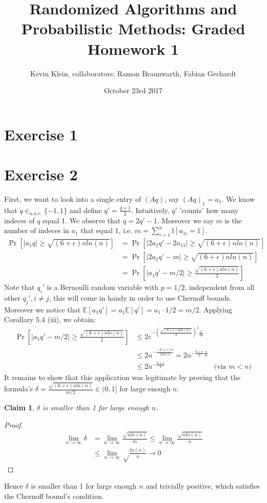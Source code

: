 \documentclass[a4paper,german]{article}
\title{Randomized Algorithms and Probabilistic Methods: Graded Homework 1}
\author{ Kevin Klein, collaborators: Ramon Braunwarth, Fabian Gerhardt}
\date{October 23rd 2017}
\newtheorem{claim}{Claim}
\newcommand{\E}{\mathbb{E}}
\begin{document}
\maketitle

\section*{Exercise 1}
\section*{Exercise 2}
First, we want to look into a single entry of \((Aq)\), say \((Aq)_1 = a_1\). We know that \(q \in_{u.a.r.} \{-1,1\}\) and define \(q' = \frac{q+1}{2}\). Intuitively, \(q'\) 'counts' how many indeces of \(q\) equal 1. We observe that \(q = 2q' - 1\).  Moreover we say \(m\) is the number of indeces in \(a_1\) that equal 1, i.e. \(m = \sum_{i=1}^n \mathbb{I}[a_{1i} = 1] \).
\begin{align*}
\Pr[|a_1q| \geq \sqrt {(6+\epsilon)nln(n)} ] &= \Pr[|2a_1q' - 2a_11| \geq \sqrt {(6+\epsilon)nln(n)} ] \\
 &= \Pr[|2a_1q' - m| \geq \sqrt {(6+\epsilon)nln(n)} ] \\
  &= \Pr[|a_1q' - m/2| \geq \frac{\sqrt {(6+\epsilon)nln(n)}}{2} ]
\end{align*}
Note that \(q_i'\) is a Bernoulli random variable with \(p = 1/2\), independent from all other \(q_j', i \neq j\), this will come in handy in order to use Chernoff bounds. Moreover we notice that \(\E[a_1q'] = 
a_1 \E[q'] = a_1 \cdot 1/2 = m/2 \).  Applying Corollary 5.4 (iii), we obtain:
\begin{align*}
 \Pr[|a_1q' - m/2| \geq \frac{\sqrt {(6+\epsilon)nln(n)}}{2} ] &\leq 2 e^{-(\frac{\sqrt {(6+\epsilon)nln(n)}}{2})^2 \frac{1}{3 \mu }} \\
 & \leq 2 n^{-\frac{(6+\epsilon)n}{12 m /2}} =  2 n^{-\frac{6+\epsilon}{6} \frac{n}{m}} \\
 & \leq 2 n^{-\frac{6+\epsilon}{6}} & \text{(via } m < n \text{)}
\end{align*}
It remains to show that this application was legitimate by proving that the formula's \(\delta = \frac{\sqrt {(6+\epsilon)nln(n)}}{m/2}  \in (0,1] \) for large enough \(n\). 
\begin{claim} \(\delta\) is smaller than 1 for large enough \(n\). \end{claim}
\begin{proof}
\begin{align*}
\lim_{n \to \infty} \delta &= \lim_{n \to \infty} \frac{\sqrt {nln(n)}}{m}  \leq \lim_{n \to \infty} \frac{\sqrt {nln(n)}}{n}  \\
& \leq \lim_{n \to \infty} \sqrt \frac{ {ln(n)}}{n}  \to 0
\end{align*}
\end{proof}
Hence \(\delta\) is smaller than 1 for large enough \(n\) and trivially positive, which satisfies the Chernoff bound's condition.
\end{document}
